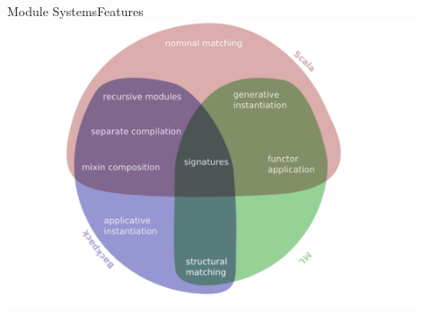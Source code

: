 \documentclass{beamer}
\begin{document}
\begin{frame}[fragile]{Module Systems}{Features}
\includegraphics[width=12cm]{features.pdf}
\end{frame}
\end{document}
